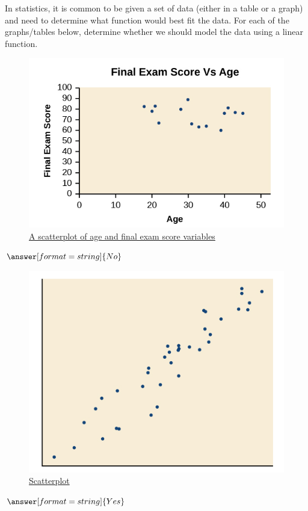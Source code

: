 \documentclass{ximera}
\begin{document}
In statistics, it is common to be given a set of data (either in a table or a graph) and need to determine what function would best fit the data. For each of the graphs/tables below, determine whether we should model the data using a linear function. 
\begin{question}
\begin{figure}
\includegraphics[scale=0.4]{finalExamVsAge.png}
\caption{\href{https://cnx.org/contents/mwjClAV_@8.12:6dX4RGdg@12/Fitting-Linear-Models-to-Data}{A scatterplot of age and final exam score variables}}
\end{figure}
$\answer[format=string]{No}$
\end{question}

\begin{question}
\begin{figure}
\includegraphics[scale=0.4]{positiveR.png}
\caption{\href{https://cnx.org/contents/mwjClAV_@8.12:6dX4RGdg@12/Fitting-Linear-Models-to-Data}{Scatterplot}}
\end{figure}
$\answer[format=string]{Yes}$
\end{question}
\end{document}
